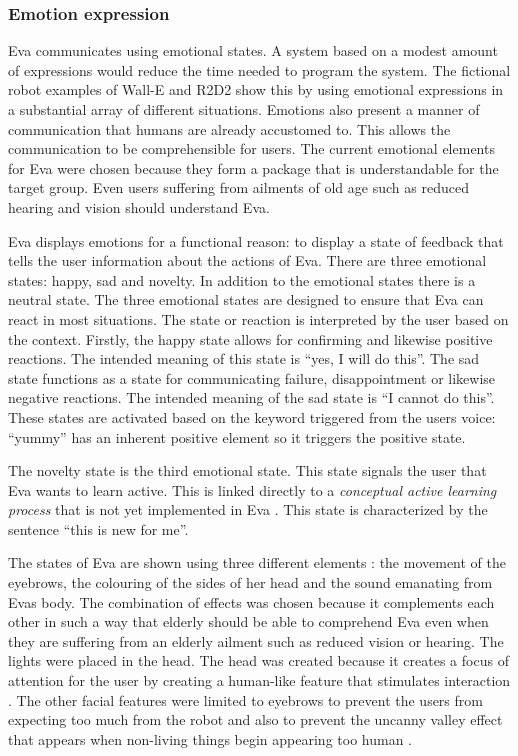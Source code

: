 \documentclass[project_eva.tex]{subfiles}
\begin{document}
\subsubsection*{Emotion expression}
\label{sec:Emotion expression}
Eva communicates using emotional states. A system based on a modest amount of expressions would reduce the time needed 
to program the system. The fictional robot examples of Wall-E and R2D2 show this by using emotional expressions in a 
substantial array of different situations. Emotions also present a manner of communication that humans are already 
accustomed to. This allows the communication to be comprehensible for users. The current emotional elements for Eva were chosen because they form a package that is understandable for the target group. Even users suffering from ailments of old age such as reduced hearing and vision should understand Eva. 

Eva displays emotions for a functional reason: to display a state of feedback that tells the user information about the 
actions of Eva. There are three emotional states: happy, sad and novelty. In  addition to the emotional states there is a 
neutral state. The three emotional states are designed to ensure that Eva can react in most situations. The state or 
reaction is interpreted by the user based on the context. Firstly, the happy  state allows for confirming and likewise 
positive reactions. The intended meaning of this state is ``yes, I will do this''. The sad state functions as a state for communicating failure, disappointment or likewise negative reactions. The intended meaning of the sad state  is ``I cannot do this''. These states are activated based on the keyword triggered from the user\textquotesingle s voice: ``yummy'' has an inherent positive element so it triggers the positive state.

The novelty state is the third emotional state. This state signals the user that Eva wants to learn active. This is 
linked 
directly to a \textit{conceptual active learning process} that is not yet implemented in Eva \pageref{concept}. This 
state is characterized by the sentence ``this is new for me''.

The states of Eva are shown using three different elements \cite{Tech}: the movement of the eyebrows, the colouring of the sides of her head  and the sound emanating from Eva\textquotesingle s body. The combination of effects was chosen because it complements each other in such a way that elderly should be able to comprehend Eva even when they are suffering from an elderly ailment such as reduced vision or hearing. The lights were placed in the head. The head was 
created because it creates a focus of attention for the user by creating a human-like feature that stimulates interaction 
\cite{elderly}. The other facial features were limited to eyebrows to prevent the users from expecting too much from the 
robot and also to prevent the uncanny valley effect that appears when non-living things begin appearing too human 
\cite{uncanny}. 
\end{document}
